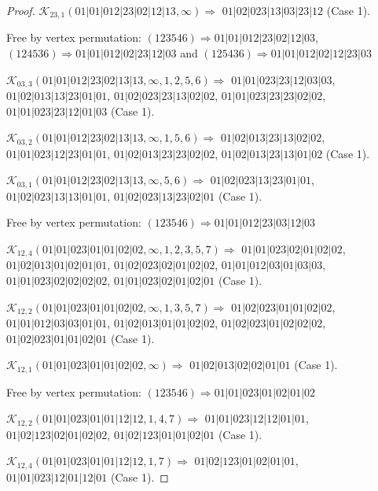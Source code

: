 \documentclass[12pt]{article}
\theoremstyle{plain}
\theoremstyle{definition}
\theoremstyle{remark}
\newcommand{\fancy}[1]{\mathcal{#1}}
\def\K{\fancy{K}}
\begin{document}
\begin{proof}
	$\K_{23,1}(01|01|012|23|02|12|13,\infty)\Rightarrow $ $01|02|023|13|03|23|12$ (Case 1).
	
	
	
	Free by vertex permutation: $(1 2 3 5 4 6)\Rightarrow 01|01|012|23|02|12|03$, $(1 2 4 5 3 6)\Rightarrow 01|01|012|02|23|12|03$ and $(1 2 5 4 3 6)\Rightarrow 01|01|012|02|12|23|03$
	
	
	
	\bigskip
	
	$\K_{03,3}(01|01|012|23|02|13|13,\infty,1, 2, 5, 6)\Rightarrow $ $01|01|023|23|12|03|03$, $01|02|013|13|23|01|01$, $01|02|023|23|13|02|02$, $01|01|023|23|23|02|02$, $01|01|023|23|12|01|03$ (Case 1).
	
	$\K_{03,2}(01|01|012|23|02|13|13,\infty,1, 5, 6)\Rightarrow $ $01|02|013|23|13|02|02$, $01|01|023|12|23|01|01$, $01|02|013|23|23|02|02$, $01|02|013|23|13|01|02$ (Case 1).
	
	$\K_{03,1}(01|01|012|23|02|13|13,\infty,5, 6)\Rightarrow $ $01|02|023|13|23|01|01$, $01|02|023|13|13|01|01$, $01|02|023|13|23|02|01$ (Case 1).
	
	
	
	Free by vertex permutation: $(1 2 3 5 4 6)\Rightarrow 01|01|012|23|03|12|03$
	
	
	
	\bigskip
	
	$\K_{12,4}(01|01|023|01|01|02|02,\infty,1, 2, 3, 5, 7)\Rightarrow $ $01|01|023|02|01|02|02$, $01|02|013|01|02|01|01$, $01|02|023|02|01|02|02$, $01|01|012|03|01|03|03$, $01|01|023|02|02|02|02$, $01|01|023|02|01|02|01$ (Case 1).
	
	$\K_{12,2}(01|01|023|01|01|02|02,\infty,1, 3, 5, 7)\Rightarrow $ $01|02|023|01|01|02|02$, $01|01|012|03|03|01|01$, $01|02|013|01|01|02|02$, $01|02|023|01|02|02|02$, $01|02|023|01|01|02|01$ (Case 1).
	
	$\K_{12,1}(01|01|023|01|01|02|02,\infty)\Rightarrow $ $01|02|013|02|02|01|01$ (Case 1).
	
	
	
	Free by vertex permutation: $(1 2 3 5 4 6)\Rightarrow 01|01|023|01|02|01|02$
	
	
	
	\bigskip
	
	$\K_{12,2}(01|01|023|01|01|12|12,1, 4, 7)\Rightarrow $ $01|01|023|12|12|01|01$, $01|02|123|02|01|02|02$, $01|02|123|01|01|02|01$ (Case 1).
	
	$\K_{12,4}(01|01|023|01|01|12|12,1, 7)\Rightarrow $ $01|02|123|01|02|01|01$, $01|01|023|12|01|12|01$ (Case 1).
	

\end{proof}
\end{document}
